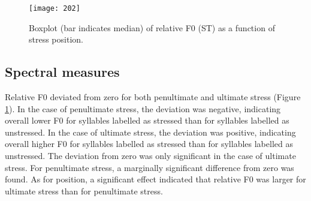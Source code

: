 \begin{table}[p]
\caption{Mean F1 and F2 (Bark) and SDs per vowel for syllables labelled as stressed and unstressed, and effects of stress (Tukey HSD) on formant displacement from/towards the vowel space centre.}
\label{tab27}
\end{table}

\begin{figure}[p]
\texttt{[image: 202]}
\caption{Boxplot (bar indicates median) of relative F0 (ST) as a function of stress position.}
\label{fig202}
\end{figure}


\subsection{Spectral measures}
Relative F0 deviated from zero for both penultimate and ultimate stress (Figure \ref{fig202}). In the case of penultimate stress, the deviation was negative, indicating overall lower F0 for syllables labelled as stressed than for syllables labelled as unstressed. In the case of ultimate stress, the deviation was positive, indicating overall higher F0 for syllables labelled as stressed than for syllables labelled as unstressed. The deviation from zero was only significant in the case of ultimate stress. For penultimate stress, a marginally significant difference from zero was found. As for position, a significant effect indicated that relative F0 was larger for ultimate stress than for penultimate stress.\par


